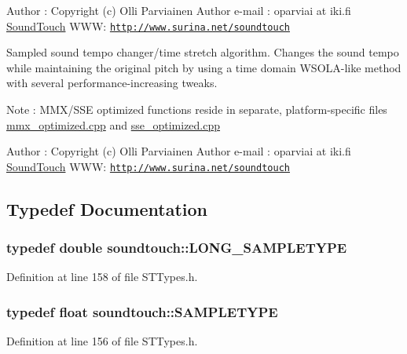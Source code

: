 Author \+: Copyright (c) Olli Parviainen Author e-\/mail \+: oparviai \textquotesingle{}at\textquotesingle{} iki.\+fi \hyperlink{classsoundtouch_1_1_sound_touch}{Sound\+Touch} W\+WW\+: \href{http://www.surina.net/soundtouch}{\tt http\+://www.\+surina.\+net/soundtouch}

Sampled sound tempo changer/time stretch algorithm. Changes the sound tempo while maintaining the original pitch by using a time domain W\+S\+O\+L\+A-\/like method with several performance-\/increasing tweaks.

Note \+: M\+M\+X/\+S\+SE optimized functions reside in separate, platform-\/specific files \textquotesingle{}\hyperlink{mmx__optimized_8cpp}{mmx\+\_\+optimized.\+cpp}\textquotesingle{} and \textquotesingle{}\hyperlink{sse__optimized_8cpp}{sse\+\_\+optimized.\+cpp}\textquotesingle{}

Author \+: Copyright (c) Olli Parviainen Author e-\/mail \+: oparviai \textquotesingle{}at\textquotesingle{} iki.\+fi \hyperlink{classsoundtouch_1_1_sound_touch}{Sound\+Touch} W\+WW\+: \href{http://www.surina.net/soundtouch}{\tt http\+://www.\+surina.\+net/soundtouch} 

\subsection{Typedef Documentation}
\subsubsection[{\texorpdfstring{L\+O\+N\+G\+\_\+\+S\+A\+M\+P\+L\+E\+T\+Y\+PE}{LONG_SAMPLETYPE}}]{\setlength{\rightskip}{0pt plus 5cm}typedef double {\bf soundtouch\+::\+L\+O\+N\+G\+\_\+\+S\+A\+M\+P\+L\+E\+T\+Y\+PE}}\hypertarget{namespacesoundtouch_a6d7c3b986241334e59ba402af1bbc127}{}\label{namespacesoundtouch_a6d7c3b986241334e59ba402af1bbc127}


Definition at line 158 of file S\+T\+Types.\+h.

\subsubsection[{\texorpdfstring{S\+A\+M\+P\+L\+E\+T\+Y\+PE}{SAMPLETYPE}}]{\setlength{\rightskip}{0pt plus 5cm}typedef float {\bf soundtouch\+::\+S\+A\+M\+P\+L\+E\+T\+Y\+PE}}\hypertarget{namespacesoundtouch_a97cfd29a7abb4d4b2a72f803d5b5850c}{}\label{namespacesoundtouch_a97cfd29a7abb4d4b2a72f803d5b5850c}


Definition at line 156 of file S\+T\+Types.\+h.

